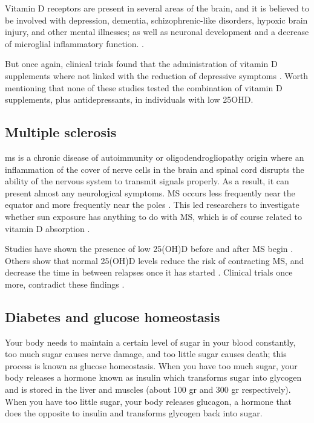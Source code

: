 Vitamin D receptors are present in several areas of the brain, and it is believed to be involved with depression, dementia, schizophrenic-like disorders, hypoxic brain injury, and other mental illnesses; as well as neuronal development and a decrease of microglial inflammatory function. \cite{ref:Anjum2018, ref:Holick2014, ref:Eyles2005, ref:Harms2011, ref:Anglin2013}.

But once again, clinical trials found that the administration of vitamin D supplements where not linked with the reduction of depressive symptoms \cite{ref:Gowda2015, ref:Jorde2018, ref:deKoning2019, ref:Jorde2019, ref:Okereke2020 }. Worth mentioning that none of these studies tested the combination of vitamin D supplements, plus antidepressants, in individuals with low 25OHD.


\subsection{Multiple sclerosis}

\gls{ms} is a chronic disease of autoimmunity or oligodendrogliopathy origin \cite{ref:Nakahara2011} where an inflammation of the cover of nerve cells in the brain and spinal cord disrupts the ability of the nervous system to transmit signals properly. As a result, it can present almost any neurological symptoms. MS occurs less frequently near the equator and more frequently near the poles \cite{ref:Jagannath2018}. This led researchers to investigate whether sun exposure has anything to do with MS, which is of course related to vitamin D absorption \cite{ref:Bouillon2021}.


Studies have shown the presence of low 25(OH)D before and after MS begin \cite{ref:Jagannath2018, ref:Munger2017, ref:Salzer2012, ref:Munger2006}. Others show that normal 25(OH)D levels reduce the risk of contracting MS, and decrease the time in between relapses once it has started \cite{ref:Sintzel2017}. Clinical trials once more, contradict these findings \cite{ref:Jagannath2018, ref:Marrie2017}.


\subsection{Diabetes and glucose homeostasis}

Your body needs to maintain a certain level of sugar in your blood constantly, too much sugar causes nerve damage, and too little sugar causes death; this process is known as glucose homeostasis. When you have too much sugar, your body releases a hormone known as insulin which transforms sugar into glycogen and is stored in the liver and muscles (about 100 gr and 300 gr respectively). When you have too little sugar, your body releases glucagon, a hormone that does the opposite to insulin and transforms glycogen back into sugar.

